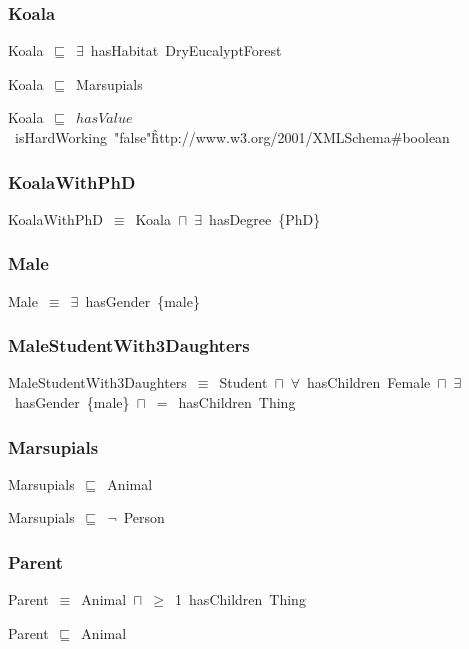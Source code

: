 \documentclass{article}
\begin{document}
\subsubsection*{Koala}

Koala~\ensuremath{\sqsubseteq}~\ensuremath{\exists}~hasHabitat~DryEucalyptForest~

Koala~\ensuremath{\sqsubseteq}~Marsupials~

Koala~\ensuremath{\sqsubseteq}~\ensuremath{hasValue}~isHardWorking~"false"\^\^http://www.w3.org/2001/XMLSchema#boolean~

\subsubsection*{KoalaWithPhD}

KoalaWithPhD~\ensuremath{\equiv}~Koala~\ensuremath{\sqcap}~\ensuremath{\exists}~hasDegree~\{PhD\}

\subsubsection*{Male}

Male~\ensuremath{\equiv}~\ensuremath{\exists}~hasGender~\{male\}

\subsubsection*{MaleStudentWith3Daughters}

MaleStudentWith3Daughters~\ensuremath{\equiv}~Student~\ensuremath{\sqcap}~\ensuremath{\forall}~hasChildren~Female~\ensuremath{\sqcap}~\ensuremath{\exists}~hasGender~\{male\}~\ensuremath{\sqcap}~\ensuremath{=}~hasChildren~Thing

\subsubsection*{Marsupials}

Marsupials~\ensuremath{\sqsubseteq}~Animal~

Marsupials~\ensuremath{\sqsubseteq}~\ensuremath{\lnot}~Person

\subsubsection*{Parent}

Parent~\ensuremath{\equiv}~Animal~\ensuremath{\sqcap}~\ensuremath{\geq}~1~hasChildren~Thing

Parent~\ensuremath{\sqsubseteq}~Animal~
\end{document}
